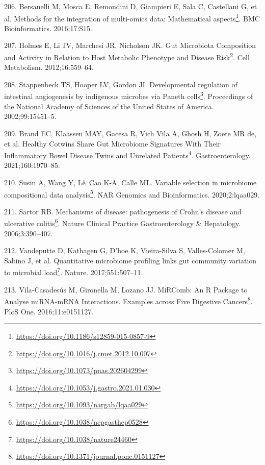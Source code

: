 \documentclass[
  12pt,
  a4paper,
  twoside,
  openright]{book}
\DeclareRobustCommand{\href}[2]{#2\footnote{\url{#1}}}
\newlength{\cslhangindent}
\newlength{\cslentryspacingunit} %
\newenvironment{CSLReferences}[2] %
 {%
  \setlength{\parindent}{0pt}
  \ifodd #1
  \let\oldpar\par
  \def\par{\hangindent=\cslhangindent\oldpar}
  \fi
  \setlength{\parskip}{#2\cslentryspacingunit}
 }%
 {}
\begin{document}
\begin{CSLReferences}{0}{0}
\leavevmode{}%
206. Bersanelli M, Mosca E, Remondini D, Giampieri E, Sala C, Castellani G, et al. \href{https://doi.org/10.1186/s12859-015-0857-9}{Methods for the integration of multi-omics data: Mathematical aspects}. BMC Bioinformatics. 2016;17:S15.

\leavevmode{}%
207. Holmes E, Li JV, Marchesi JR, Nicholson JK. \href{https://doi.org/10.1016/j.cmet.2012.10.007}{Gut Microbiota Composition and Activity in Relation to Host Metabolic Phenotype and Disease Risk}. Cell Metabolism. 2012;16:559--64.

\leavevmode{}%
208. Stappenbeck TS, Hooper LV, Gordon JI. \href{https://doi.org/10.1073/pnas.202604299}{Developmental regulation of intestinal angiogenesis by indigenous microbes via Paneth cells}. Proceedings of the National Academy of Sciences of the United States of America. 2002;99:15451--5.

\leavevmode{}%
209. Brand EC, Klaassen MAY, Gacesa R, Vich Vila A, Ghosh H, Zoete MR de, et al. \href{https://doi.org/10.1053/j.gastro.2021.01.030}{Healthy Cotwins Share Gut Microbiome Signatures With Their Inflammatory Bowel Disease Twins and Unrelated Patients}. Gastroenterology. 2021;160:1970--85.

\leavevmode{}%
210. Susin A, Wang Y, Lê~Cao K-A, Calle ML. \href{https://doi.org/10.1093/nargab/lqaa029}{Variable selection in microbiome compositional data analysis}. NAR Genomics and Bioinformatics. 2020;2:lqaa029.

\leavevmode{}%
211. Sartor RB. \href{https://doi.org/10.1038/ncpgasthep0528}{Mechanisms of disease: pathogenesis of Crohn's disease and ulcerative colitis}. Nature Clinical Practice Gastroenterology \& Hepatology. 2006;3:390--407.

\leavevmode{}%
212. Vandeputte D, Kathagen G, D'hoe K, Vieira-Silva S, Valles-Colomer M, Sabino J, et al. \href{https://doi.org/10.1038/nature24460}{Quantitative microbiome profiling links gut community variation to microbial load}. Nature. 2017;551:507--11.

\leavevmode{}%
213. Vila-Casadesús M, Gironella M, Lozano JJ. \href{https://doi.org/10.1371/journal.pone.0151127}{MiRComb: An R Package to Analyse miRNA-mRNA Interactions. Examples across Five Digestive Cancers}. PloS One. 2016;11:e0151127.


\end{CSLReferences}
\end{document}
